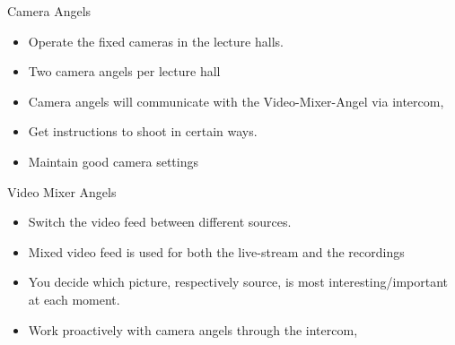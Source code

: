 \documentclass[aspectratio=169]{beamer}
\begin{document}
\begin{frame}{Camera Angels}
	\begin{itemize}
		\item Operate the fixed cameras in the lecture halls. 
		\item Two camera angels per lecture hall 
		\item Camera angels will communicate with the Video-Mixer-Angel via intercom,
		\item Get instructions to shoot in certain ways. 
		\item Maintain good camera settings 
	\end{itemize}
\end{frame}

\begin{frame}{Video Mixer Angels}
	\begin{itemize}
		\item Switch the video feed between different sources. 
		\item Mixed video feed is used for both the live-stream and the recordings 
		\item You decide which picture, respectively source, is most interesting/important at each moment.
		\item Work proactively with camera angels through the intercom, 
	\end{itemize}
\end{frame}

\end{document}
